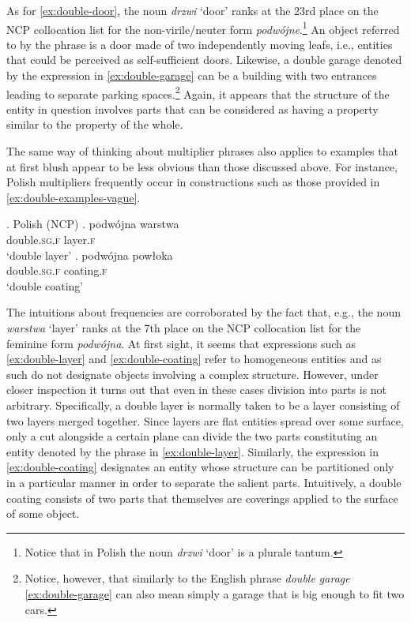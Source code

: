 As for \ref{ex:double-door}, the noun \textit{drzwi} `door' ranks at the 23rd place on the NCP collocation list for the non-virile/neuter form \textit{podwójne}.\footnote{Notice that in Polish the noun \textit{drzwi} `door' is a plurale tantum.} An object referred to by the phrase is a door made of two independently moving leafs, i.e., entities that could be perceived as self-sufficient doors. Likewise, a double garage denoted by the expression in \ref{ex:double-garage} can be a building with two entrances leading to separate parking spaces.\footnote{Notice, however, that similarly to the English phrase \textit{double garage} \ref{ex:double-garage} can also mean simply a garage that is big enough to fit two cars.} Again, it appears that the structure of the entity in question involves parts that can be considered as having a property similar to the property of the whole. 

The same way of thinking about multiplier phrases also applies to examples that at first blush appear to be less obvious than those discussed above. For instance, Polish multipliers frequently occur in constructions such as those provided in \ref{ex:double-examples-vague}.\largerpage

\ex. Polish (NCP)\label{ex:double-examples-vague}
\ag. podwójna warstwa\\
double\textsc{.sg.f} layer\textsc{.f}\\
`double layer'\label{ex:double-layer}
\bg. podwójna powłoka\\
double\textsc{.sg.f} coating\textsc{.f}\\
`double coating'\label{ex:double-coating}

The intuitions about frequencies are corroborated by the fact that, e.g., the noun \textit{warstwa} `layer' ranks at the 7th place on the NCP collocation list for the feminine form \textit{podwójna}. At first sight, it seems that expressions such as \ref{ex:double-layer} and \ref{ex:double-coating} refer to homogeneous entities and as such do not designate objects involving a complex structure. However, under closer inspection it turns out that even in these cases division into parts is not arbitrary. Specifically, a double layer is normally taken to be a layer consisting of two layers merged together. Since layers are flat entities spread over some surface, only a cut alongside a certain plane can divide the two parts constituting an entity denoted by the phrase in \ref{ex:double-layer}. Similarly, the expression in \ref{ex:double-coating} designates an entity whose structure can be partitioned only in a particular manner in order to separate the salient parts. Intuitively, a double coating consists of two parts that themselves are coverings applied to the surface of some object.

